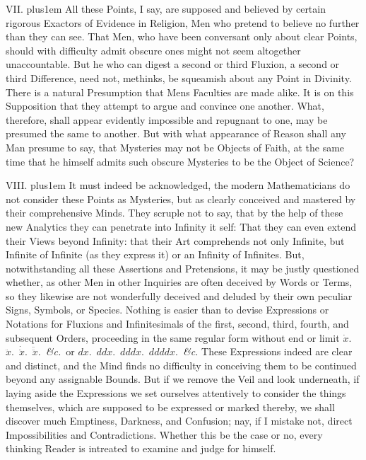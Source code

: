 \medbreak

VII. \hskip 0pt plus1em
All these Points, I say, are supposed and believed by certain
rigorous Exactors of Evidence in Religion, Men who pretend to
believe no further than they can see.  That Men, who have been
conversant only about clear Points, should with difficulty admit
obscure ones might not seem altogether unaccountable.  But he who
can digest a second or third Fluxion, a second or third
Difference, need not, methinks, be squeamish about any Point in
Divinity.  There is a natural Presumption that Mens Faculties are
made alike.  It is on this Supposition that they attempt to argue
and convince one another.  What, therefore, shall appear
evidently impossible and repugnant to one, may be presumed the
same to another.  But with what appearance of Reason shall any
Man presume to say, that Mysteries may not be Objects of Faith,
at the same time that he himself admits such obscure Mysteries to
be the Object of Science?

\medbreak

VIII. \hskip 0pt plus1em
It must indeed be acknowledged, the modern Mathematicians do not
consider these Points as Mysteries, but as clearly conceived and
mastered by their comprehensive Minds.  They scruple not to say,
that by the help of these new Analytics they can penetrate into
Infinity it self: That they can even extend their Views beyond
Infinity: that their Art comprehends not only Infinite, but
Infinite of Infinite (as they express it) or an Infinity of
Infinites.  But, notwithstanding all these Assertions and
Pretensions, it may be justly questioned whether, as other Men in
other Inquiries are often deceived by Words or Terms, so they
likewise are not wonderfully deceived and deluded by their own
peculiar Signs, Symbols, or Species.  Nothing is easier than to
devise Expressions or Notations for Fluxions and Infinitesimals
of the first, second, third, fourth, and subsequent Orders,
proceeding in the same regular form without end or limit
$\dot{x}$.\ $\ddot{x}$.\ $\dot{\ddot{x}}$.\ $\ddot{\ddot{x}}$.\
{\it \&c.}\ or
$dx$.\ $ddx$.\ $dddx$.\ $ddddx$.\ {\it \&c.}  These Expressions
indeed are clear and distinct, and the Mind finds no difficulty
in conceiving them to be continued beyond any assignable Bounds.
But if we remove the Veil and look underneath, if laying aside
the Expressions we set ourselves attentively to consider the
things themselves, which are supposed to be expressed or marked
thereby, we shall discover much Emptiness, Darkness, and
Confusion; nay, if I mistake not, direct Impossibilities and
Contradictions.  Whether this be the case or no, every thinking
Reader is intreated to examine and judge for himself.

